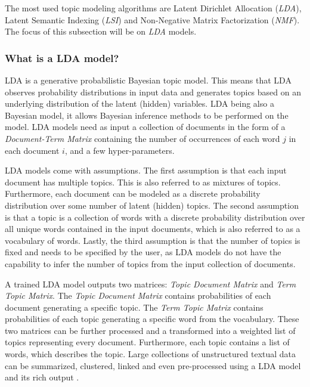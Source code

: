         The most used topic modeling algorithms are Latent Dirichlet Allocation (\emph{LDA}), Latent Semantic Indexing (\emph{LSI}) and Non-Negative Matrix Factorization (\emph{NMF}). The focus of this subsection will be on \emph{LDA} models.
    
        \subsubsection{What is a LDA model?}
            
           LDA is a generative probabilistic Bayesian topic model. This means that LDA observes probability distributions in input data and generates topics based on an underlying distribution of the latent (hidden) variables. LDA being also a Bayesian model, it allows Bayesian inference methods to be performed on the model. LDA models need as input a collection of documents in the form of a \emph{Document-Term Matrix} containing the number of occurrences of each word $j$ in each document $i$, and a few hyper-parameters. 
           
           LDA models come with assumptions. The first assumption is that each input document has multiple topics. This is also referred to as mixtures of topics. Furthermore, each document can be modeled as a discrete probability distribution over some number of latent (hidden) topics. The second assumption is that a topic is a collection of words with a discrete probability distribution over all unique words contained in the input documents, which is also referred to as a vocabulary of words. Lastly, the third assumption is that the number of topics is fixed and needs to be specified by the user, as LDA models do not have the capability to infer the number of topics from the input collection of documents.
           
            A trained LDA model outputs two matrices: \emph{Topic Document Matrix} and \emph{Term Topic Matrix}. The \emph{Topic Document Matrix} contains probabilities of each document generating a specific topic. The \emph{Term Topic Matrix} contains probabilities of each topic generating a specific word from the vocabulary. These two matrices can be further processed and a transformed into a weighted list of topics representing every document. Furthermore, each topic contains a list of words, which describes the topic. Large collections of unstructured textual data can be summarized, clustered, linked and even pre-processed using a LDA model and its rich output \cite{campbell2015latent}.
        
